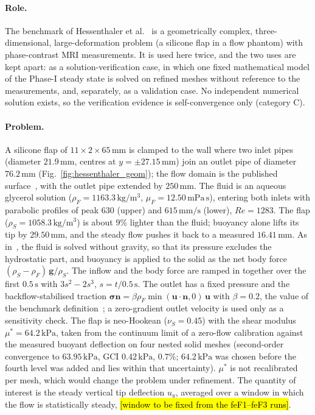 \paragraph{Role.}
The benchmark of Hessenthaler et al.~\citep{Hessenthaler2017a,Hessenthaler2017b} is a geometrically complex, three-dimensional, large-deformation problem (a silicone flap in a flow phantom) with phase-contrast MRI measurements.
It is used here twice, and the two uses are kept apart: as a solution-verification case, in which one fixed mathematical model of the Phase-I steady state is solved on refined meshes without reference to the measurements, and, separately, as a validation case.
No independent numerical solution exists, so the verification evidence is self-convergence only (category C).

\paragraph{Problem.}
A silicone flap of $11 \times 2 \times 65\,\mathrm{mm}$ is clamped to the wall where two inlet pipes (diameter $21.9\,\mathrm{mm}$, centres at $y = \pm27.15\,\mathrm{mm}$) join an outlet pipe of diameter $76.2\,\mathrm{mm}$ (Fig.~\ref{fig:hessenthaler_geom}); the flow domain is the published surface~\citep{Hessenthaler2017a}, with the outlet pipe extended by $250\,\mathrm{mm}$.
The fluid is an aqueous glycerol solution ($\rho_F = 1163.3\,\mathrm{kg/m^3}$, $\mu_F = 12.50\,\mathrm{mPa\,s}$), entering both inlets with parabolic profiles of peak $630$ (upper) and $615\,\mathrm{mm/s}$ (lower), $Re = 1283$.
The flap ($\rho_S = 1058.3\,\mathrm{kg/m^3}$) is about $9\%$ lighter than the fluid; buoyancy alone lifts its tip by $29.50\,\mathrm{mm}$, and the steady flow pushes it back to a measured $16.41\,\mathrm{mm}$.
As in~\citep{Hessenthaler2017b}, the fluid is solved without gravity, so that its pressure excludes the hydrostatic part, and buoyancy is applied to the solid as the net body force $(\rho_S - \rho_F)\,\mathbf{g}/\rho_S$. The inflow and the body force are ramped in together over the first $0.5\,\mathrm{s}$ with $3s^2 - 2s^3$, $s = t/0.5\,\mathrm{s}$.
The outlet has a fixed pressure and the backflow-stabilised traction $\boldsymbol{\sigma}\mathbf{n} = \beta \rho_F \min(\mathbf{u}\cdot\mathbf{n}, 0)\,\mathbf{u}$ with $\beta = 0.2$, the value of the benchmark definition~\citep{Hessenthaler2017b,EsmailyMoghadam2011}; a zero-gradient outlet velocity is used only as a sensitivity check.
The flap is neo-Hookean ($\nu_S = 0.45$) with the shear modulus $\mu^* = 64.2\,\mathrm{kPa}$, taken from the continuum limit of a zero-flow calibration against the measured buoyant deflection on four nested solid meshes (second-order convergence to $63.95\,\mathrm{kPa}$, GCI $0.42\,\mathrm{kPa}$, $0.7\%$; $64.2\,\mathrm{kPa}$ was chosen before the fourth level was added and lies within that uncertainty). $\mu^*$ is not recalibrated per mesh, which would change the problem under refinement.
The quantity of interest is the steady vertical tip deflection $u_y$, averaged over a window in which the flow is statistically steady, \hl{[window to be fixed from the feF1--feF3 runs]}.

